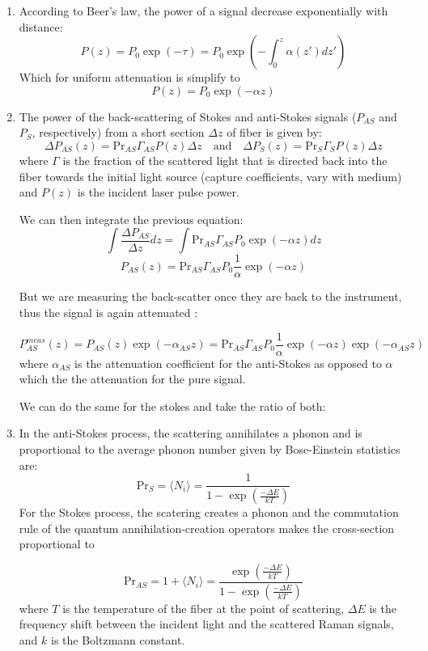\documentclass[twocolumn]{article}
\numberwithin{equation}{section}
\begin{document}
\begin{enumerate}

\item According to Beer's law, the power of a signal  decrease exponentially with distance:
$$P(z) = P_0 \exp (-\tau) = P_0 \exp (-\int_0^z \alpha(z') dz')$$
Which for uniform attenuation is simplify to
$$P(z) = P_0 \exp (-\alpha z)$$


\item The power of the back-scattering of Stokes and anti-Stokes signals ($P_{AS}$ and $P_S$, respectively) from a short section $\Delta z$ of fiber is given by:
 $$\Delta P_{AS}(z) = \text{Pr}_{AS} \Gamma_{AS} P(z) \Delta z \quad \text{and} \quad \Delta P_{S}(z) = \text{Pr}_{S} \Gamma_{S} P(z) \Delta z $$	
where $\Gamma$ is the fraction of the scattered light that is directed back into the fiber towards the initial light source (capture coefficients, vary with medium) and $P(z)$ is the incident laser pulse power. 

We can then integrate the previous equation:
$$ \int \frac{\Delta P_{AS}}{\Delta z} d z= \int \text{Pr}_{AS} \Gamma_{AS} P_0 \exp (-\alpha z)dz $$
$$ P_{AS}(z)= \text{Pr}_{AS} \Gamma_{AS} P_0 \frac{1}{\alpha}\exp (-\alpha z)$$

But we are measuring the back-scatter once they are back to the instrument, thus the signal is again attenuated :

$$ P_{AS}^{meas}(z)= P_{AS}(z) \exp (-\alpha_{AS} z)= \text{Pr}_{AS} \Gamma_{AS} P_0 \frac{1}{\alpha}\exp (-\alpha z)\exp (-\alpha_{AS} z)$$
where $\alpha_{AS}$ is the attenuation coefficient for the anti-Stokes as opposed to $\alpha$ which the the attenuation for the pure signal.

We can do the same for the stokes and take the ratio of both:

\item In the anti-Stokes process, the scattering annihilates a phonon and is proportional to the average phonon number given by Bose-Einstein statistics are:
$$ \text{Pr}_{S} = \langle N_i \rangle=  \frac{1}{1-\exp\left(\frac{-\Delta E}{kT}\right)}$$ 
For the Stokes  process, the scatering creates a phonon and the commutation rule of the quantum annihilation-creation operators makes the cross-section proportional to 

$$ \text{Pr}_{AS} = 1 +\langle N_i \rangle=\frac{\exp\left(\frac{-\Delta E}{kT}\right)}{1-\exp\left(\frac{-\Delta E}{kT}\right)}$$  
 where $T$ is the temperature of the fiber at the point of scattering, $\Delta E$ is the frequency shift between the incident light and the scattered Raman signals, and $k$ is the Boltzmann constant. 


\end{enumerate}
\end{document}
